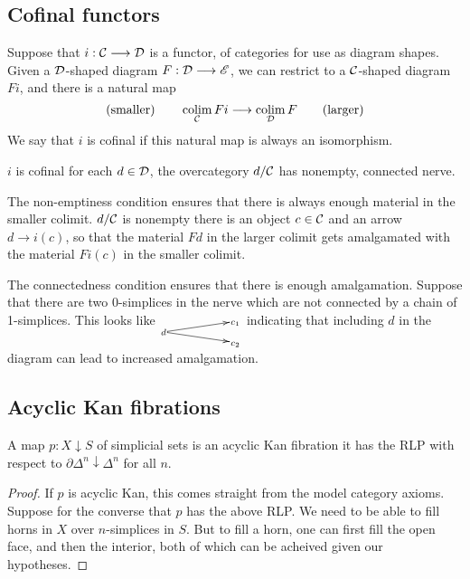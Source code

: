 \documentclass[11pt]{article}
\newcommand{\myheading}[1]
{{\noindent\Large #1}

}
\renewcommand{\myheading}[1]{\subsection{#1}}
\begin{document}
\begin{Cofinal functors}
\myheading{Cofinal functors}
Suppose that $i:\mathcal{C}\longrightarrow\mathcal{D}$ is a functor, of categories for use as diagram shapes. Given a $\mathcal{D}$-shaped diagram $F:\mathcal{D}\longrightarrow\mathscr{E}$, we can restrict to a $\mathcal{C}$-shaped diagram $Fi$, and there is a natural map
\[\textup{(smaller)\qquad }\operatorname*{colim}_{\mathcal{C}} Fi\longrightarrow\operatorname*{colim}_{\mathcal{D}} F\textup{\qquad (larger)}\]
We say that $i$ is cofinal if this natural map is always an isomorphism.
\begin{thm*}
$i$ is cofinal \Iff for each $d\in\mathcal{D}$, the overcategory $d/\mathcal{C}$ has nonempty, connected nerve.
\end{thm*}
\begin{itemise}
\setlength{\parindent}{.25in}
\item The non-emptiness condition ensures that there is always enough material in the smaller colimit. $d/\mathcal{C}$ is nonempty \Iff there is an object $c\in\mathcal{C}$ and an arrow $d\to i(c)$, so that the material $Fd$ in the larger colimit gets amalgamated with the material $Fi(c)$ in the smaller colimit.
\item The connectedness condition ensures that there is enough amalgamation. Suppose that there are two 0-simplices in the nerve which are not connected by a chain of 1-simplices. This looks like
${
\def\objectstyle{\scriptstyle}
\xymatrix@R=3mm@C=2cm@!0@1{
&%
c_1 \\%
d
\ar[ur]
\ar[dr]
&%
\\%
&%
c_2 %
}}$
indicating that including $d$ in the diagram can lead to increased amalgamation.
\end{itemise}
\end{Cofinal functors}
\begin{Acyclic Kan fibrations}
\myheading{Acyclic Kan fibrations}
\begin{thm*}
A map $p:X\downarrow S$ of simplicial sets is an acyclic Kan fibration \Iff it has the RLP with respect to $\partial\Delta^n\downarrow\Delta^n$ for all $n$.
\end{thm*}
\begin{proof}
If $p$ is acyclic Kan, this comes straight from the model category axioms. Suppose for the converse that $p$ has the above RLP. We need to be able to fill horns in $X$ over $n$-simplices in $S$. But to fill a horn, one can first fill the open face, and then the interior, both of which can be acheived given our hypotheses.
\end{proof}
\end{Acyclic Kan fibrations}
\end{document}
